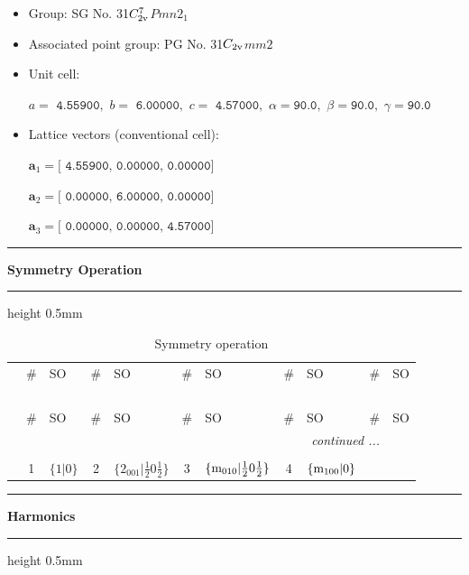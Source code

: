 \documentclass[fleqn,10pt,landscape]{jsarticle}
\begin{document}
\begin{itemize}
\item Group: SG No. 31\quad$C_{\rm 2v}^{7}$\quad$Pmn2_1$\quad[ orthorhombic ]
\item Associated point group: PG No. 31\quad$C_{\rm 2v}$\quad$mm2$\quad[ orthorhombic ]
\end{itemize}
\begin{itemize}
\item Unit cell:

\quad $a=\texttt{ 4.55900},\,\, b=\texttt{ 6.00000},\,\, c=\texttt{ 4.57000},\,\, \alpha=\texttt{90.0},\,\, \beta=\texttt{90.0},\,\, \gamma=\texttt{90.0}$

\item Lattice vectors (conventional cell):

\quad $\bm{a}_1=\texttt{[ 4.55900, 0.00000, 0.00000]}$

\quad $\bm{a}_2=\texttt{[ 0.00000, 6.00000, 0.00000]}$

\quad $\bm{a}_3=\texttt{[ 0.00000, 0.00000, 4.57000]}$

\end{itemize}
\vspace{5mm}
\noindent \rule[0.5mm]{5mm}{0.5mm}\hspace{3mm}\textbf{Symmetry Operation}\hspace{3mm}\leaders\hrule height 0.5mm\hfill\kern0pt
\vspace{3mm}

\renewcommand{\arraystretch}{1.6}
\begin{longtable}[l]{c|cl|cl|cl|cl|cl}
\captionsetup{justification=raggedright, singlelinecheck=off}
\caption{Symmetry operation}
 \\
 \hline \hline
 & \# & SO & \# & SO & \# & SO & \# & SO & \# & SO \\ \hline \endfirsthead

\multicolumn{10}{l}{\tablename\ \thetable{}} \\
 \hline \hline
 & \# & SO & \# & SO & \# & SO & \# & SO & \# & SO \\ \hline \endhead

 \hline \hline
\multicolumn{10}{r}{\footnotesize\it continued ...} \\ \endfoot

 \hline \hline
\multicolumn{10}{r}{} \\ \endlastfoot

 & 1 & $\{1|0\}$ & 2 & $\{2{}_{001}|\frac{1}{2} 0 \frac{1}{2}\}$ & 3 & $\{{\rm m}_{010}|\frac{1}{2} 0 \frac{1}{2}\}$ & 4 & $\{{\rm m}_{100}|0\}$ \\
\end{longtable}
\vspace{5mm}
\noindent \rule[0.5mm]{5mm}{0.5mm}\hspace{3mm}\textbf{Harmonics}\hspace{3mm}\leaders\hrule height 0.5mm\hfill\kern0pt
\vspace{3mm}
\end{document}
